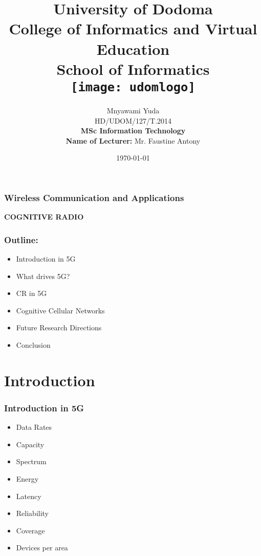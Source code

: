 \documentclass{beamer}
\begin{document}
\title{University of Dodoma\\ 
College of Informatics and Virtual Education\\
School of Informatics\\
\texttt{[image: udomlogo]}
}
\author{Mnyawami Yuda\\
HD/UDOM/127/T.2014\\
\textbf{MSc Information Technology}\\
\textbf{Name of Lecturer:} Mr. Faustine Antony
} 
\date{\today} 

\begin{frame}
\titlepage
\end{frame}
\begin{frame}
\frametitle{Wireless Communication and Applications}
\textbf{COGNITIVE RADIO}
\end{frame}

\begin{frame}
\frametitle{Outline:}
\begin{itemize}
\item Introduction in 5G\\
\item What drives 5G?\\
\item CR in 5G\\
\item Cognitive Cellular Networks \\
\item Future Research Directions\\
\item Conclusion\\
\end{itemize}
\end{frame}

\section{Introduction}
\begin{frame}
\frametitle{Introduction in 5G}
\begin{itemize}
\item Data Rates
\item Capacity
\item Spectrum
\item Energy
\item Latency
\item Reliability
\item Coverage
\item Devices per area
\end{itemize}
\end{frame}
\end{document}
